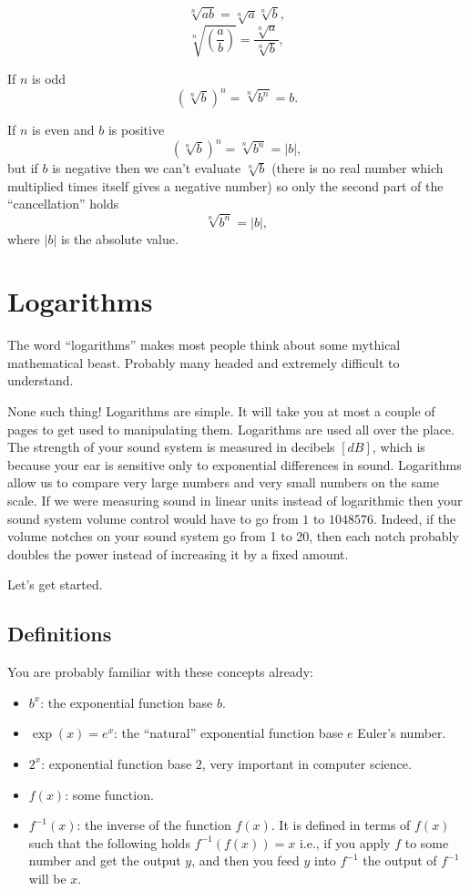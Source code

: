 \documentclass[journal]{IEEEtran}
\newcommand{\dokutitleleveltwo}[1]{\section{#1}}
\newcommand{\dokutitleleveltree}[1]{\subsection{#1}}
\newcommand{\dokuitem}{\item}
\begin{document}
\[
  \sqrt[n]{ab} = \sqrt[n]{a}\sqrt[n]{b},
\]
\[
  \sqrt[n]{\left(\frac{a}{b}\right)} = \frac{\sqrt[n]{a} }{ \sqrt[n]{b} },
\]

If \(n\) is odd
\[
  \left( \sqrt[n]{b} \right)^n = \sqrt[n]{ b^n } = b.
\]

If \(n\) is even and \(b\) is positive
\[
  \left( \sqrt[n]{b} \right)^n = \sqrt[n]{ b^n } = |b|,
\]
but if \(b\) is negative then we can't evaluate \(\sqrt[n]{b}\)
(there is no real number which multiplied times itself gives a negative number)
so only the second part of the ``cancellation'' holds
\[
   \sqrt[n]{ b^n } = |b|,
\]
where \(|b|\) is the absolute value.




\dokutitleleveltwo{Logarithms}
\label{c95a6da6fb331984f198feec0b0bb1a5}%

The word ``logarithms'' makes most people think about some mythical
mathematical beast. Probably many headed and extremely difficult to
understand.

None such thing!  Logarithms are simple. It will take you 
at most a couple of pages to get used to manipulating them. 
Logarithms are used all over the place.
The strength of your sound system is measured in decibels \([dB]\), 
which is because your ear is sensitive only to exponential differences
in sound.
Logarithms allow us to compare very large numbers and very 
small numbers on the same scale. If we were measuring sound
in linear units instead of logarithmic then your sound system
volume control would have to go from \(1\) to \(1048576\). 
Indeed, if the volume notches on your sound system go from 1 to 20,
then each notch probably doubles the power 
instead of increasing it by a fixed amount.

Let's get started.


\dokutitleleveltree{Definitions}
\label{9fdc1f6b239f0e86ec8651552f2b0683}%

You are probably familiar with these concepts already:


\begin{itemize}\dokuitem  \(b^x\): the exponential function base \(b\).
\dokuitem  \(\exp(x)=e^x\): the ``natural'' exponential function base \(e\)  Euler's number.
\dokuitem  \(2^x\): exponential function base \(2\), very important in computer science.
\dokuitem  \(f(x)\): some function.
\dokuitem  \(f^{-1}(x)\): the inverse of the function \(f(x)\). It is defined in terms of \(f(x)\)  such that the following holds \(f^{-1}(f(x))=x\) i.e.,  if you apply \(f\) to some number and get the output \(y\), and then you feed \(y\) into \(f^{-1}\) the output of \(f^{-1}\) will be \(x\).
\end{itemize}
\end{document}
